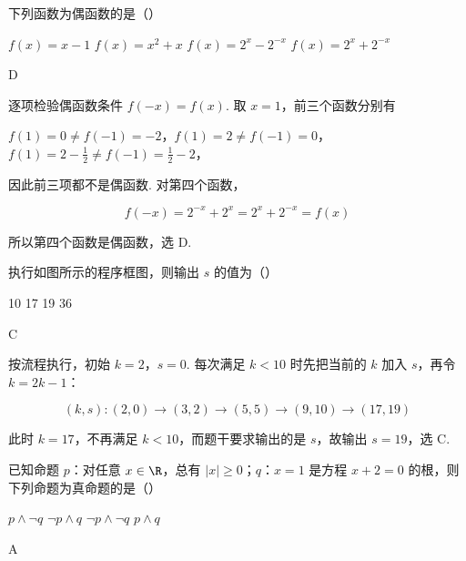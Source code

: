 \begin{problem}
下列函数为偶函数的是（\quad）

\choices
    {\( f(x) = x - 1 \)}
    {\(f(x) = x^{2} + x\)}
    {\( f(x)=2^{x}-2^{-x} \)}
    {\(f(x) = 2^{x} + 2^{-x}\)}
\end{problem}

\begin{answer}
D
\end{answer}

\begin{solution}
逐项检验偶函数条件 \(f(-x)=f(x)\). 取 \(x=1\)，前三个函数分别有

\(f(1)=0\ne f(-1)=-2\)，\(f(1)=2\ne f(-1)=0\)，\(f(1)=2-\frac12\ne f(-1)=\frac12-2\)，

因此前三项都不是偶函数. 对第四个函数，

\[
f(-x)=2^{-x}+2^x=2^x+2^{-x}=f(x)
\]

所以第四个函数是偶函数，选 D.
\end{solution}

\begin{problem}
执行如图所示的程序框图，则输出 \(s\) 的值为（\quad）


\choices
    {10}
    {17}
    {19}
    {36}
\end{problem}

\begin{answer}
C
\end{answer}

\begin{solution}
按流程执行，初始 \(k=2\)，\(s=0\). 每次满足 \(k<10\) 时先把当前的 \(k\) 加入 \(s\)，再令 \(k=2k-1\)：

\[
(k,s):(2,0)\to(3,2)\to(5,5)\to(9,10)\to(17,19)
\]

此时 \(k=17\)，不再满足 \(k<10\)，而题干要求输出的是 \(s\)，故输出 \(s=19\)，选 C.
\end{solution}

\begin{problem}
已知命题 \(p\)：对任意 \(x \in \R\)，总有 \(|x| \geqslant 0\)；\(q\)：\(x = 1\) 是方程 \(x + 2 = 0\) 的根，则下列命题为真命题的是（\quad）

\choices
    {\(p \wedge \neg q\)}
    {\(\neg p \land q\)}
    {\(\neg p \land \neg q\)}
    {\(p \wedge q\)}
\end{problem}

\begin{answer}
A
\end{answer}

